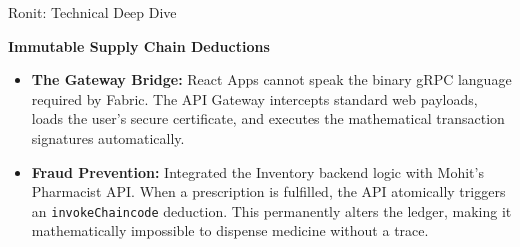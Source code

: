 \documentclass[10pt,aspectratio=169]{beamer}
\begin{document}
\begin{frame}{Ronit: Technical Deep Dive}
    \begin{center}
        \textbf{Immutable Supply Chain Deductions}
    \end{center}
    \vspace{0.2cm}
    \begin{itemize}
        \item \textbf{The Gateway Bridge:} React Apps cannot speak the binary gRPC language required by Fabric. The API Gateway intercepts standard web payloads, loads the user's secure certificate, and executes the mathematical transaction signatures automatically.
        \item \textbf{Fraud Prevention:} Integrated the Inventory backend logic with Mohit's Pharmacist API. When a prescription is fulfilled, the API atomically triggers an \texttt{invokeChaincode} deduction. This permanently alters the ledger, making it mathematically impossible to dispense medicine without a trace.
    \end{itemize}
\end{frame}
\end{document}
